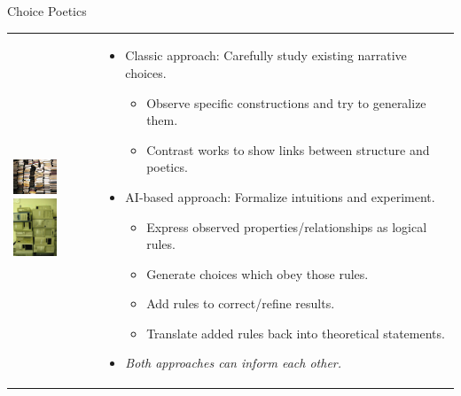 \documentclass[xcolor=x11names]{beamer}
\begin{document}
\begin{frame}{Choice Poetics}
  \hspace*{-2em}%
  \begin{tabular}{p{1em} p{\textwidth}}
  \vspace{2.25em}
  \includegraphics[width=3.5em]{res/stacked-books.jpg} \newline
  \vspace{2em}
  \includegraphics[width=3.5em]{res/stacked-computers.jpg}
  &
  \begin{itemize}\addtolength{\itemsep}{0.5\baselineskip}
      \item Classic approach: Carefully study existing narrative choices.
    \begin{itemize}\addtolength{\itemsep}{0.5\baselineskip}
      \vspace{0.5\baselineskip}
      \item Observe specific constructions and try to generalize them.
      \item Contrast works to show links between structure and poetics.
    \end{itemize}
    \item AI-based approach: Formalize intuitions and experiment.
    \begin{itemize}\addtolength{\itemsep}{0.5\baselineskip}
      \vspace{0.5\baselineskip}
      \item Express observed properties/relationships as logical rules.
      \item Generate choices which obey those rules.
      \item Add rules to correct/refine results.
      \item Translate added rules back into theoretical statements.
    \end{itemize}
    \pause
  \item \emph{Both approaches can inform each other.}
  \end{itemize}
  \end{tabular}
\end{frame}
\end{document}
